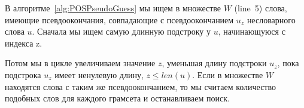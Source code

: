 В алгоритме~\ref{alg:POSPseudoGuess} 
мы ищем в множестве $W$ (line~5) слова, имеющие псевдоокончания, совпадающие с псевдоокончанием $u_z$ несловарного слова $u$. 
Сначала мы ищем самую длинную подстроку у $u$, начинающуюся с индекса z. 

Потом мы в цикле увеличиваем значение $z$, уменьшая длину подстроки $u_z$, пока 
подстрока $u_z$ имеет ненулевую длину, $z \leq len(u)$.
Если в множестве $W$ находятся слова с таким же псевдоокончанием, то мы считаем количество подобных слов для каждого грамсета и останавливаем поиск.